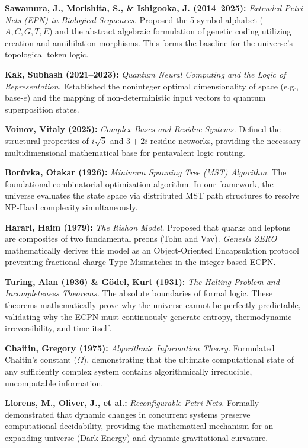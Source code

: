\documentclass[11pt, a4paper]{article}
\begin{document}
\begin{enumerate}[leftmargin=*, label=\textbf{[\arabic*]}]
    \item \textbf{Sawamura, J., Morishita, S., \& Ishigooka, J. (2014--2025):} \textit{Extended Petri Nets (EPN) in Biological Sequences.} Proposed the 5-symbol alphabet ($A, C, G, T, E$) and the abstract algebraic formulation of genetic coding utilizing creation and annihilation morphisms. This forms the baseline for the universe's topological token logic.
    
    \item \textbf{Kak, Subhash (2021--2023):} \textit{Quantum Neural Computing and the Logic of Representation.} Established the noninteger optimal dimensionality of space (e.g., base-$e$) and the mapping of non-deterministic input vectors to quantum superposition states.
    
    \item \textbf{Voinov, Vitaly (2025):} \textit{Complex Bases and Residue Systems.} Defined the structural properties of $i\sqrt{5}$ and $3+2i$ residue networks, providing the necessary multidimensional mathematical base for pentavalent logic routing.
    
    \item \textbf{Borůvka, Otakar (1926):} \textit{Minimum Spanning Tree (MST) Algorithm.} The foundational combinatorial optimization algorithm. In our framework, the universe evaluates the state space via distributed MST path structures to resolve NP-Hard complexity simultaneously.
    
    \item \textbf{Harari, Haim (1979):} \textit{The Rishon Model.} Proposed that quarks and leptons are composites of two fundamental preons (Tohu and Vav). \textit{Genesis ZERO} mathematically derives this model as an Object-Oriented Encapsulation protocol preventing fractional-charge Type Mismatches in the integer-based ECPN.
    
    \item \textbf{Turing, Alan (1936) \& Gödel, Kurt (1931):} \textit{The Halting Problem and Incompleteness Theorems.} The absolute boundaries of formal logic. These theorems mathematically prove why the universe cannot be perfectly predictable, validating why the ECPN must continuously generate entropy, thermodynamic irreversibility, and time itself.
    
    \item \textbf{Chaitin, Gregory (1975):} \textit{Algorithmic Information Theory.} Formulated Chaitin's constant ($\Omega$), demonstrating that the ultimate computational state of any sufficiently complex system contains algorithmically irreducible, uncomputable information.
    
    \item \textbf{Llorens, M., Oliver, J., et al.:} \textit{Reconfigurable Petri Nets.} Formally demonstrated that dynamic changes in concurrent systems preserve computational decidability, providing the mathematical mechanism for an expanding universe (Dark Energy) and dynamic gravitational curvature.
\end{enumerate}
\end{document}
